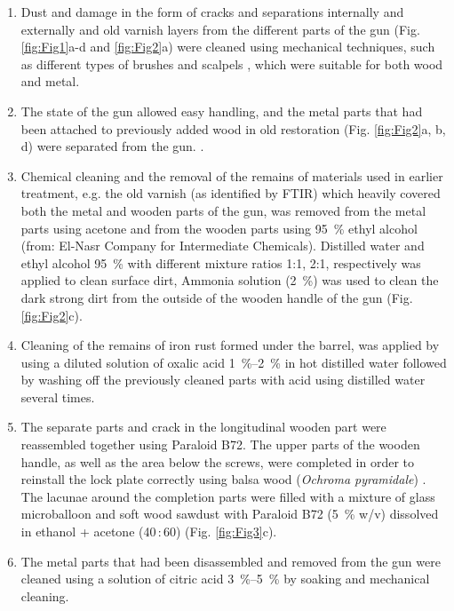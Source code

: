 \begin{enumerate}
	\item Dust and damage in the form of cracks and separations internally and externally and old varnish layers from the different parts of the gun (Fig. \ref{fig:Fig1}a-d and \ref{fig:Fig2}a) were cleaned using mechanical techniques, such as different types of brushes and scalpels \parencite[143]{Unger_2001}, which were suitable for both wood and metal.
	\item The state of the gun allowed easy handling, and the metal parts that had been attached to previously added wood in old restoration (Fig. \ref{fig:Fig2}a, b, d) were separated from the gun.  \parencites[1--2]{Davis_1998}[1--15]{Zelinka_2005}.
	\item Chemical cleaning and the removal of the remains of materials used in earlier treatment, e.g. the old varnish (as identified by FTIR) which heavily covered both the metal and wooden parts of the gun, was removed from the metal parts using acetone and from the wooden parts using \SI{95}{\percent} ethyl alcohol (from: El-Nasr Company for Intermediate Chemicals). Distilled water and ethyl alcohol \SI{95}{\percent} with different mixture ratios 1:1, 2:1, respectively was applied to clean surface dirt, Ammonia solution (\SI{2}{\percent}) was used to clean the dark strong dirt from the outside of the wooden handle of the gun (Fig. \ref{fig:Fig2}c). 
	\item Cleaning of the remains of iron rust formed under the barrel, was applied by using a diluted solution of oxalic acid \SIrange[range-phrase=--]{1}{2}{\percent} in hot distilled water \parencites[5]{William_1999}[1--20]{Williams_2002} followed by washing off the previously cleaned parts with acid using distilled water several times.
	\item The separate parts and crack in the longitudinal wooden part were reassembled together using Paraloid B72. 
The upper parts of the wooden handle, as well as the area below the screws, were completed in order to reinstall the lock plate correctly using balsa wood (\textit{Ochroma pyramidale}) \parencite[4--11]{Newman_2013}. The lacunae around the completion parts were filled with a mixture of glass microballoon and soft wood sawdust with Paraloid B72 (\SI{5}{\percent} w/v) dissolved in ethanol + acetone (40\,:\,60) (Fig. \ref{fig:Fig3}c).
	\item The metal parts that had been disassembled and removed from the gun were cleaned using a solution of citric acid \SIrange[range-phrase=--]{3}{5}{\percent} by soaking and mechanical cleaning. 

\end{enumerate}
